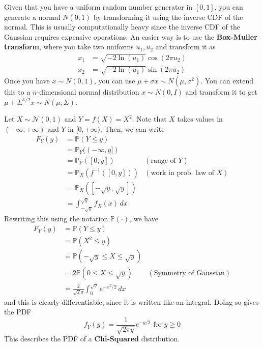   \begin{example}
    \label{ex:box-muller-transform}
    Given that you have a uniform random number generator in $[0, 1]$, you can generate a normal $N(0, 1)$ by transforming it using the inverse CDF of the normal. This is usually computationally heavy since the inverse CDF of the Gaussian requires expensive operations. An easier way is to use the \textbf{Box-Muller transform}, where you take two uniforms $u_1, u_2$ and transform it as 
    \begin{align*}
        x_1 & = \sqrt{-2 \ln(u_1)} \cos(2 \pi u_2) \\
        x_2 & = \sqrt{-2 \ln(u_1)} \sin(2 \pi u_2)
    \end{align*}
    Once you have $x \sim N(0, 1)$, you can use $\mu + \sigma x \sim N(\mu, \sigma^2)$. You can extend this to a $n$-dimensional normal distribution $x \sim N(0, I)$ and transform it to get $\mu + \Sigma^{1/2} x \sim N(\mu, \Sigma)$. 
  \end{example}

  \begin{example}
    \label{ex:chi-squared-distribution}
    Let $X \sim \mathcal{N}(0, 1)$ and $Y = f(X) = X^2$. Note that $X$ takes values in $(-\infty, +\infty)$ and $Y$ in $[0, +\infty)$. Then, we can write 
    \begin{align*}
      F_Y (y) & = \mathbb{P}(Y \leq y) \\ 
      & = \mathbb{P}_Y ( (-\infty, y]) \\
      & = \mathbb{P}_Y (  [0, y]) & (\text{range of } Y) \\
      & = \mathbb{P}_X ( f^{-1} ([0, y]) ) & (\text{work in prob. law of } X) \\
      & = \mathbb{P}_X ( [-\sqrt{y}, \sqrt{y}] ) \\
      & = \int_{-\sqrt{y}}^{\sqrt{y}} f_X (x) \,dx 
    \end{align*}
    Rewriting this using the notation $\mathbb{P}(\cdot)$, we have 
    \begin{align*}
      F_Y (y) & = \mathbb{P}(Y \leq y) \\
      & = \mathbb{P}(X^2 \leq y) \\
      & = \mathbb{P}( -\sqrt{y} \leq X \leq \sqrt{y}) \\
      & = 2 \mathbb{P}(0 \leq X \leq \sqrt{y}) & (\text{Symmetry of Gaussian})\\
      & = \frac{2}{\sqrt{2} \pi} \int_0^{\sqrt{y}} e^{-x^2 / 2} \,dx 
    \end{align*}
    and this is clearly differentiable, since it is written like an integral. Doing so gives the PDF
    \begin{equation}
      f_Y (y) = \frac{1}{\sqrt{2 \pi y}} e^{-y/2} \text{ for } y \geq 0
    \end{equation}
    This describes the PDF of a \textbf{Chi-Squared} distribution. 
  \end{example}

